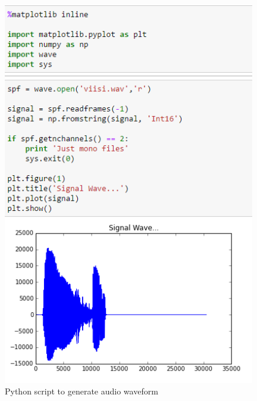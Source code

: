 \documentclass[11pt,a4paper,oneside,article]{memoir}
\begin{document}
\begin{figure}
\includegraphics[width=11cm]{python}
\caption{Python script to generate audio waveform}
\label{fig:python}
\end{figure}

\end{document}
